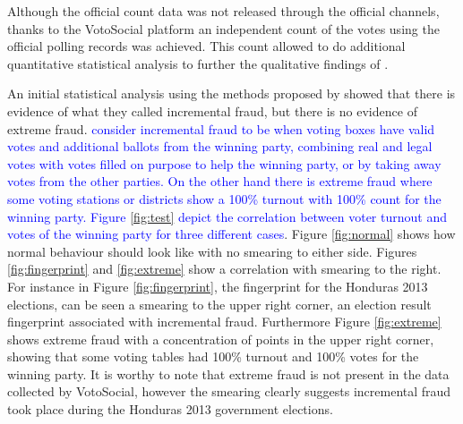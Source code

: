 \documentclass[letterpaper,10pt]{article}
\begin{document}
Although the official count data was not released through the official channels, thanks to the VotoSocial platform an independent count of the votes using the official polling records was achieved. This count allowed to do additional quantitative statistical analysis to further the qualitative findings of \cite{gonza2014}.

An initial statistical analysis using the methods proposed by \cite{klimek2012} showed that there is evidence of what they called incremental fraud, but there is no evidence of extreme fraud. \citep{klimek2012} \textcolor{blue}{consider incremental fraud to be when voting boxes have valid votes and additional ballots from the winning party, combining real and legal votes with votes filled on purpose to help the winning party, or by taking away votes from the other parties. On the other hand there is extreme fraud where some voting stations or districts show a 100\% turnout with 100\% count for the winning party. Figure \ref{fig:test} depict the correlation between voter turnout and votes of the winning party for three different cases}. Figure \ref{fig:normal} shows how normal behaviour should look like with no smearing to either side. Figures \ref{fig:fingerprint} and \ref{fig:extreme} show a correlation with smearing to the right. For instance in Figure \ref{fig:fingerprint}, the fingerprint for the Honduras 2013 elections, can be seen a smearing to the upper right corner, an election result fingerprint associated with incremental fraud. Furthermore Figure \ref{fig:extreme} shows extreme fraud with a concentration of points in the upper right corner, showing that some voting tables had 100\% turnout and 100\% votes for the winning party. It is worthy to note that extreme fraud is not present in the data collected by VotoSocial, however the smearing clearly suggests incremental fraud took place during the Honduras 2013 government elections.

\end{document}
